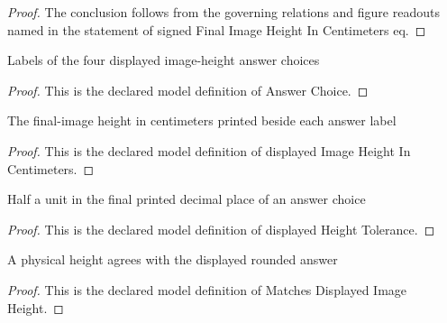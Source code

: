 \begin{proof}
  The conclusion follows from the governing relations and figure readouts named in the statement of signed Final Image Height In Centimeters eq.
\end{proof}
\begin{definition}
  \label{def:physics:phyx-mini-0077:phyxminiproblems-problemphyxmini0077-answerchoice}
  Labels of the four displayed image-height answer choices
\end{definition}
\begin{proof}
  This is the declared model definition of Answer Choice.
\end{proof}
\begin{definition}
  \label{def:physics:phyx-mini-0077:phyxminiproblems-problemphyxmini0077-displayedimageheightincentimeters}
  The final-image height in centimeters printed beside each answer label
\end{definition}
\begin{proof}
  This is the declared model definition of displayed Image Height In Centimeters.
\end{proof}
\begin{definition}
  \label{def:physics:phyx-mini-0077:phyxminiproblems-problemphyxmini0077-displayedheighttolerance}
  Half a unit in the final printed decimal place of an answer choice
\end{definition}
\begin{proof}
  This is the declared model definition of displayed Height Tolerance.
\end{proof}
\begin{definition}
  \label{def:physics:phyx-mini-0077:phyxminiproblems-problemphyxmini0077-matchesdisplayedimageheight}
  A physical height agrees with the displayed rounded answer
\end{definition}
\begin{proof}
  This is the declared model definition of Matches Displayed Image Height.
\end{proof}
